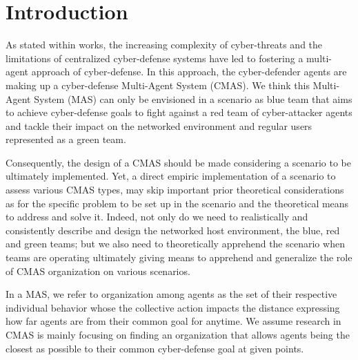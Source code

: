 \documentclass[runningheads]{llncs}
\begin{document}
\section{Introduction}

As stated within  works\cite{kott2023autonomous}, the increasing complexity of cyber-threats and the limitations of centralized cyber-defense systems have led to fostering a multi-agent approach of cyber-defense. In this approach, the cyber-defender agents are making up a cyber-defense Multi-Agent System (CMAS). We think this Multi-Agent System (MAS) can only be envisioned in a scenario as blue team that aims to achieve cyber-defense goals to fight against a red team of cyber-attacker agents and tackle their impact on the networked environment and regular users represented as a green team.

Consequently, the design of a CMAS should be made considering a scenario to be ultimately implemented. Yet, a direct empiric implementation of a scenario to assess various CMAS types, may skip important prior theoretical considerations as for the specific problem to be set up in the scenario and the theoretical means to address and solve it. Indeed, not only do we need to realistically and consistently describe and design the networked host environment, the blue, red and green teams; but we also need to theoretically apprehend the scenario when teams are operating ultimately giving means to apprehend and generalize the role of CMAS organization on various scenarios.

In a MAS, we refer to organization among agents as the set of their respective individual behavior whose the collective action impacts the distance expressing how far agents are from their common goal for anytime. We assume research in CMAS is mainly focusing on finding an organization that allows agents being the closest as possible to their common cyber-defense goal at given points.

\end{document}
